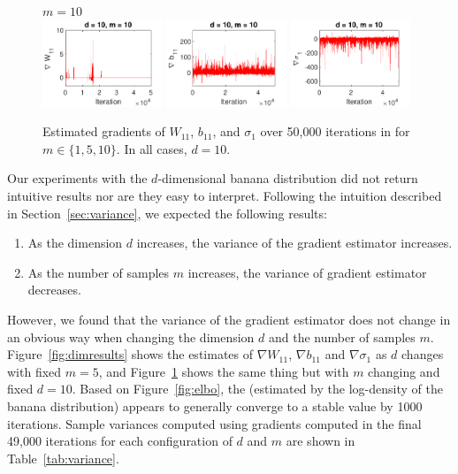 \documentclass[10pt]{article}
\begin{document}
\begin{figure}[p!]
\\
$m=10$ \\
\includegraphics[width=0.32\textwidth,trim={0 0 0 11.5},clip]{images/bananaND_usivi_gW11_d10_m10.pdf}
\includegraphics[width=0.32\textwidth,trim={0 0 0 11.5},clip]{images/bananaND_usivi_gb11_d10_m10.pdf}
\includegraphics[width=0.32\textwidth,trim={0 0 0 11.5},clip]{images/bananaND_usivi_gsigma1_d10_m10.pdf}
\caption{Estimated gradients of $W_{11}$, $b_{11}$, and $\sigma_1$ over 50,000 \sgd iterations in \uivi for $m\in\{1,5,10\}$. In all cases, $d=10$.}
\label{fig:mcmcresults}
\end{figure}

Our experiments with the $d$-dimensional banana distribution did not return intuitive results nor are they easy to interpret. Following the intuition described in Section~\ref{sec:variance}, we expected the following results:
\begin{enumerate}
\item
As the dimension $d$ increases, the variance of the \elbo gradient estimator increases.
\item
As the number of \mcmc samples $m$ increases, the variance of \elbo gradient estimator decreases.
\end{enumerate}
However, we found that the variance of the \elbo gradient estimator does not change in an obvious way when changing the dimension $d$ and the number of \mcmc samples $m$. Figure~\ref{fig:dimresults} shows the estimates of $\nabla W_{11}$, $\nabla b_{11}$ and $\nabla \sigma_1$ as $d$ changes with fixed $m=5$, and Figure~\ref{fig:mcmcresults} shows the same thing but with $m$ changing and fixed $d=10$. Based on Figure~\ref{fig:elbo}, the \elbo (estimated by the log-density of the banana distribution) appears to generally converge to a stable value by 1000 iterations. Sample variances computed using gradients computed in the final 49,000 \sgd iterations for each configuration of $d$ and $m$ are shown in Table~\ref{tab:variance}.
\\
\end{document}

